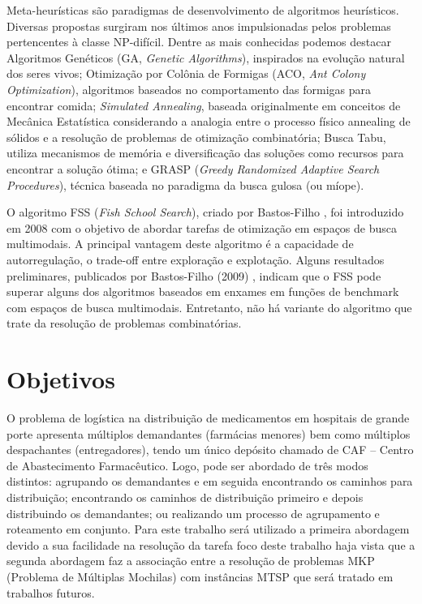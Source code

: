 Meta-heurísticas são paradigmas de desenvolvimento de algoritmos heurísticos. Diversas propostas surgiram nos últimos anos impulsionadas pelos problemas pertencentes à classe NP-difícil. Dentre as mais conhecidas podemos destacar Algoritmos Genéticos (GA, \textit{Genetic Algorithms}), inspirados na evolução natural dos seres vivos; Otimização por Colônia de Formigas (ACO, \textit{Ant Colony Optimization}), algoritmos baseados no comportamento das formigas para encontrar comida; \textit{Simulated Annealing}, baseada originalmente em conceitos de Mecânica Estatística considerando a analogia entre o processo físico annealing de sólidos e a resolução de problemas de otimização combinatória; Busca Tabu, utiliza mecanismos de memória e diversificação das soluções como recursos para encontrar a solução ótima; e GRASP (\textit{Greedy Randomized Adaptive Search Procedures}), técnica baseada no paradigma da busca gulosa (ou míope).

O algoritmo FSS (\textit{Fish School Search}), criado por Bastos-Filho \cite{bastos2008novel}, foi introduzido em 2008 com o objetivo de abordar tarefas de otimização em espaços de busca multimodais. A principal vantagem deste algoritmo é a capacidade de autorregulação, o trade-off entre exploração e explotação. Alguns resultados preliminares, publicados por Bastos-Filho (2009) \cite{bastos2009fish}, indicam que o FSS pode superar alguns dos algoritmos baseados em enxames em funções de benchmark com espaços de busca multimodais. Entretanto, não há variante do algoritmo que trate da resolução de problemas combinatórias.

\section{Objetivos}
\label{sec-objetivos}

O problema de logística na distribuição de medicamentos em hospitais de grande porte apresenta múltiplos demandantes (farmácias menores) bem como múltiplos despachantes (entregadores), tendo um único depósito chamado de CAF – Centro de Abastecimento Farmacêutico. Logo, pode ser abordado de três modos distintos: agrupando os demandantes e em seguida encontrando os caminhos para distribuição; encontrando os caminhos de distribuição primeiro e depois distribuindo os demandantes; ou realizando um processo de agrupamento e roteamento em conjunto. Para este trabalho será utilizado a primeira abordagem devido a sua facilidade na resolução da tarefa foco deste trabalho haja vista que a segunda abordagem faz a associação entre a resolução de problemas MKP (Problema de Múltiplas Mochilas) com instâncias MTSP que será tratado em trabalhos futuros.


